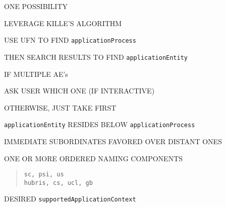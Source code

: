 \begin{bwslide}

\begin{nrtc}
\item	ONE POSSIBILITY
    \begin{nrtc}
    \item	LEVERAGE KILLE'S ALGORITHM
    \end{nrtc}

\item	USE UFN TO FIND \verb"applicationProcess"

\item	THEN SEARCH RESULTS TO FIND \verb"applicationEntity"

\item	IF MULTIPLE AE's
    \begin{nrtc}
    \item	ASK USER WHICH ONE (IF INTERACTIVE)

    \item	OTHERWISE, JUST TAKE FIRST
    \end{nrtc}
\end{nrtc}
\end{bwslide}


\begin{bwslide}

\begin{nrtc}
\item	\verb"applicationEntity" RESIDES BELOW \verb"applicationProcess"

\item	IMMEDIATE SUBORDINATES FAVORED OVER DISTANT ONES
\end{nrtc}
\end{bwslide}


\begin{bwslide}

\begin{nrtc}
\item	ONE OR MORE ORDERED NAMING COMPONENTS
\begin{quote}\small\begin{verbatim}
sc, psi, us
hubris, cs, ucl, gb
\end{verbatim}\end{quote}

\item	DESIRED \verb"supportedApplicationContext"
\end{nrtc}
\end{bwslide}


